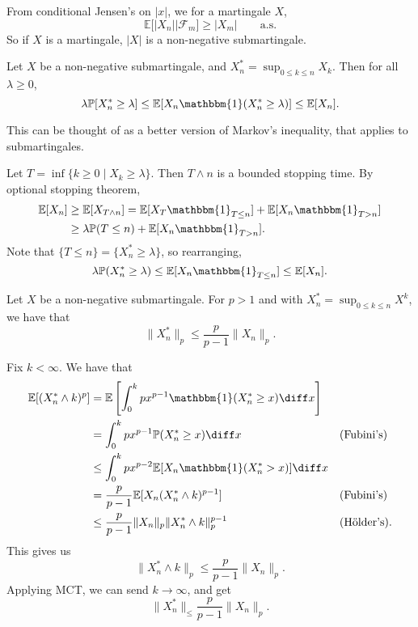 \documentclass[12pt]{article}
\begin{document}

From conditional Jensen's on $|x|$, we for a martingale $X$,
\[
	\mathbb{E}[|X_n| | \mathcal{F}_m] \geq |X_m| \qquad \text{a.s.}
\]
So if $X$ is a martingale, $|X|$ is a non-negative submartingale.

\begin{theorem}
	Let $X$ be a non-negative submartingale, and $X_n^\ast = \sup_{0\leq k \leq n} X_k$. Then for all $\lambda \geq 0$,
	\[
		\lambda \mathbb{P}[X_n^\ast \geq \lambda] \leq \mathbb{E}[X_n \mathbbm{1}(X_n^\ast \geq \lambda)] \leq \mathbb{E}[X_n].
	\]
\end{theorem}

This can be thought of as a better version of Markov's inequality, that applies to submartingales.

\begin{proofbox}
	Let $T = \inf\{k \geq 0 \mid X_k \geq \lambda\}$. Then $T \wedge n$ is a bounded stopping time. By optional stopping theorem,
	\begin{align*}
		\mathbb{E}[X_n] &\geq \mathbb{E}[X_{T \wedge n}] = \mathbb{E}[X_T \mathbbm{1}_{T \leq n}] + \mathbb{E}[X_n \mathbbm{1}_{T > n}] \\
				&\geq \lambda \mathbb{P}(T \leq n) + \mathbb{E}[X_n \mathbbm{1}_{T > n}].
	\end{align*}
	Note that $\{T \leq n\} = \{X_n^\ast \geq \lambda\}$, so rearranging,
	\[
	\lambda \mathbb{P}(X_n^\ast \geq \lambda) \leq \mathbb{E}[X_n \mathbbm{1}_{T \leq n}] \leq \mathbb{E}[X_n].
	\]
\end{proofbox}

\begin{theorem}
	Let $X$ be a non-negative submartingale. For $p > 1$ and with $X_n^\ast = \sup_{0 \leq k \leq n} X^k$, we have that
	\[
	\|X_n^\ast\|_p \leq \frac{p}{p-1} \|X_n\|_p.
	\]
\end{theorem}

\begin{proofbox}
	Fix $k < \infty$. We have that
	\begin{align*}
		\mathbb{E}[(X_n^\ast \wedge k)^p] &= \mathbb{E}\left[ \int_0^k p x^{p-1} \mathbbm{1}(X_n^\ast \geq x) \diff x \right] & & \\
						  &= \int_0^k px^{p-1} \mathbb{P}(X_n^\ast \geq x) \diff x & &\text{(Fubini's)} \\
						  &\leq \int_0^k p x^{p-2} \mathbb{E}[X_n \mathbbm{1}(X_n^\ast > x)] \diff x & & \\
						  &= \frac{p}{p-1} \mathbb{E}[X_n(X_n^\ast \wedge k)^{p-1}] & &\text{(Fubini's)} \\
						  &\leq \frac{p}{p-1} \|X_n\|_p \|X_n^\ast \wedge k\|_p^{p-1} & &\text{(H\"older's)}.
	\end{align*}
	This gives us
	\[
	\|X_n^\ast \wedge k\|_p \leq \frac{p}{p-1} \|X_n\|_p.
	\]
	Applying MCT, we can send $k \to \infty$, and get
	\[
	\|X_n^\ast\|_ \leq \frac{p}{p-1}\|X_n\|_p.
	\]
\end{proofbox}
\end{document}
